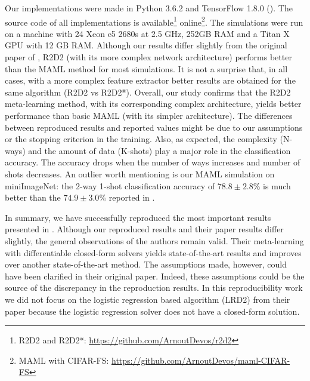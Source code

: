 \newpage
Our implementations were made in Python 3.6.2 and TensorFlow 1.8.0 (\citet{tensorflow}). The source code of all implementations is available\footnote{R2D2 and R2D2*: \url{https://github.com/ArnoutDevos/r2d2}} online\footnote{MAML with CIFAR-FS: \url{https://github.com/ArnoutDevos/maml-CIFAR-FS}}. The simulations were run on a machine with 24 Xeon e5 2680s at 2.5 GHz, 252GB RAM and a Titan X GPU with 12 GB RAM.
\newpage
Although our results differ slightly from the original paper of \citet{R2D2}, R2D2 (with its more complex network architecture) performs better than the MAML method for most simulations. It is not a surprise that, in all cases, with a more complex feature extractor better results are obtained for the same algorithm (R2D2 vs R2D2*). Overall, our study confirms that the R2D2 meta-learning method, with its corresponding complex architecture, yields better performance than basic MAML (with its simpler architecture). The differences between reproduced results and reported values might be due to our assumptions or the stopping criterion in the training. Also, as expected, the complexity (N-ways) and the amount of data (K-shots) play a major role in the classification accuracy. The accuracy drops when the number of ways increases and number of shots decreases. An outlier worth mentioning is our MAML simulation on miniImageNet: the 2-way 1-shot classification accuracy of $78.8 \pm 2.8\%$ is much better than the $74.9 \pm 3.0\%$ reported in \citet{finn}.

In summary, we have successfully reproduced the most important results presented in \citet{R2D2}. Although our reproduced results and their paper results differ slightly, the general observations of the authors remain valid. Their meta-learning with differentiable closed-form solvers yields state-of-the-art results and improves over another state-of-the-art method. The assumptions made, however, could have been clarified in their original paper. Indeed, these assumptions could be the source of the discrepancy in the reproduction results. In this reproducibility work we did not focus on the logistic regression based algorithm (LRD2) from their paper because the logistic regression solver does not have a closed-form solution.

